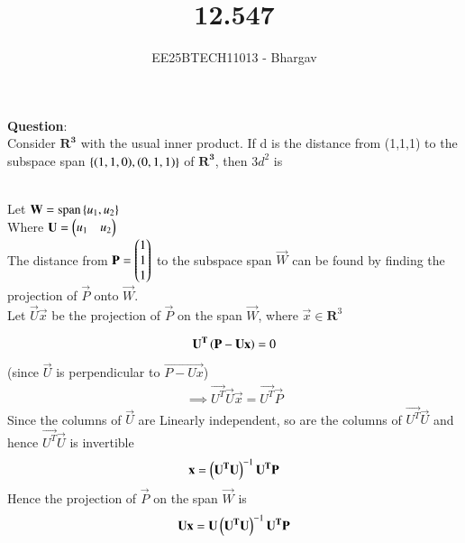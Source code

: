 \documentclass[journal]{IEEEtran}
\begin{document}

\vspace{3cm}

\title{12.547}
\author{EE25BTECH11013 - Bhargav}
\maketitle
    {\let\newpage\relax\maketitle}

\renewcommand{\thefigure}{\theenumi}
\renewcommand{\thetable}{\theenumi}
\setlength{\intextsep}{10pt} %

\renewcommand{\thetable}{\theenumi}

\textbf{Question}: \\
Consider $\mathbf{R^3}$ with the usual inner product. If d  is the distance from (1,1,1) to the subspace span $\left\{(1,1,0), (0,1,1)\right\}$ of $\mathbf{R^3}$, then $3d^2$ is

\solution \\
Let
$\mathbf{W} = \operatorname{span}\left\{u_1, u_2\right\}$\\
Where $\mathbf{U} = \begin{pmatrix}u_1 & u_2\end{pmatrix}$ \\

The distance from $\mathbf{P} = \begin{pmatrix}1 \\ 1 \\ 1\end{pmatrix}$ to the subspace span $\vec{W}$ can be found by finding the projection of $\vec{P}$ onto $\vec{W}$.\\

 Let $\vec{U}\vec{x}$ be the projection of $\vec{P}$ on the span $\vec{W}$, where $\vec{x} \in \mathbf{R}^3$

\begin{align}
\mathbf{U^T}\left(\mathbf{P-Ux}\right)=0
\end{align}
(since $\vec{U}$ is perpendicular to $\vec{P-Ux}$)
\begin{align}
\implies \vec{U^T}\vec{U}\vec{x} = \vec{U^T}\vec{P}
\end{align}
Since the columns of $\vec{U}$ are Linearly independent, so are the columns of $\vec{U^T}\vec{U}$ and hence $\vec{U^T}\vec{U}$ is invertible 
\begin{align}
\mathbf{x} = \left(\mathbf{U^T}\mathbf{U}\right)^{-1} \mathbf{U^T}\mathbf{P}
\end{align}
Hence the projection of $\vec{P}$ on the span $\vec{W}$ is
\begin{align}
\mathbf{U}\mathbf{x} = \mathbf{U}\left(\mathbf{U^T}\mathbf{U}\right)^{-1} \mathbf{U^T}\mathbf{P}
\end{align}
\end{document}
